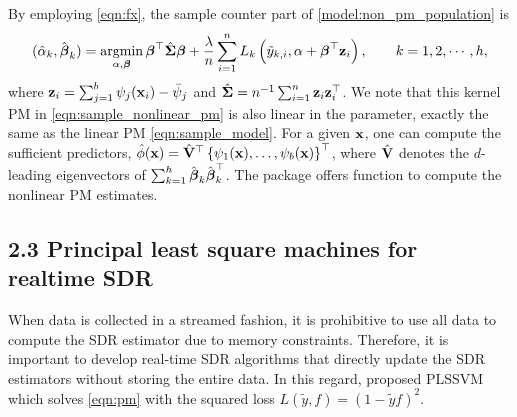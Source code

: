 By employing \eqref{eqn:fx}, the sample counter part of \eqref{model:non_pm_population} is 
\begin{equation}\label{eqn:sample_nonlinear_pm}
(\hat \alpha_k, \hat {\boldsymbol{\beta}}_k) = \mathop{\rm argmin}_{\alpha, \boldsymbol{\beta}} {\boldsymbol{\beta}}^{\top} \hat {\boldsymbol{\Sigma}} {\boldsymbol{\beta}}+\frac{\lambda}{n} 
   \sum_{i=1}^{n} L_{k} \left( \tilde{y}_{k,i}, \alpha + {\boldsymbol{\beta}}^{\top} \mathbf{z}_{i} \right), \qquad k = 1, 2, \cdots, h,   
\end{equation}
where $\mathbf{z}_i = \sum_{j=1}^b \psi_{j}(\mathbf{x}_i)- \bar \psi_j$ and $\hat {\boldsymbol{\Sigma}} = n^{-1} \sum_{i=1}^{n} \boldsymbol{\mathbf{z}}_i \boldsymbol{\mathbf{z}}_i^{\top}$. We note that this kernel PM in \eqref{eqn:sample_nonlinear_pm} is also linear in the parameter, exactly the same as the linear PM \eqref{eqn:sample_model}. 
For a given $\mathbf{x}$, one can compute the sufficient predictors, $\hat{\phi}(\mathbf{x})=\hat{\mathbf{V}}^{\top}\left\{ \psi_1(\mathbf{x}), \ldots,  \psi_b(\mathbf{x})\right\}^{\top}$, where $\hat{\mathbf{V}}$ denotes the $d$-leading eigenvectors of $\sum_{k=1}^h \hat{\boldsymbol{\beta}}_{k} \hat{\boldsymbol{\beta}}_{k}^{\top}$. The  package offers  function to compute the nonlinear PM estimates.

\subsection{2.3 Principal least square machines for realtime SDR} \label{sec:rtPSDR}
When data is collected in a streamed fashion, it is prohibitive to use all data to compute the SDR estimator due to memory constraints. Therefore, it is important to develop real-time SDR algorithms that directly update the SDR estimators without storing the entire data. In this regard, \citet{artemiou2021real} proposed PLSSVM which solves \eqref{eqn:pm} with the squared loss $L(\tilde y, f) = (1 - \tilde y f)^2$.

